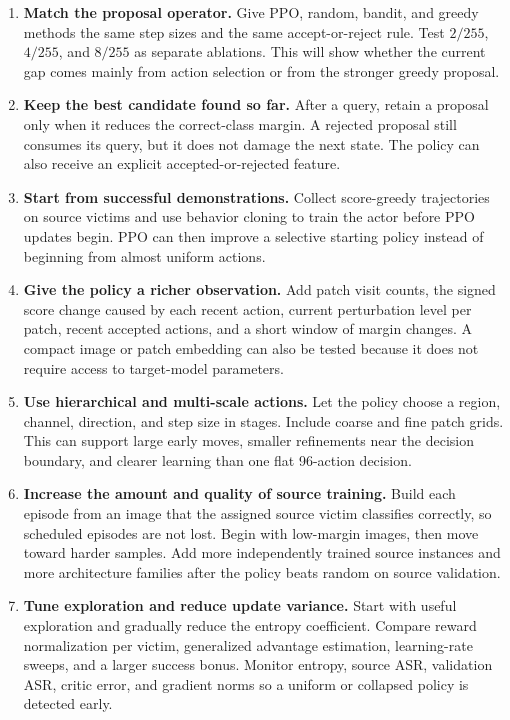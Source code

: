 \documentclass[11pt,a4paper]{report}
\begin{document}
\begin{enumerate}
  \item \textbf{Match the proposal operator.}
  Give PPO, random, bandit, and greedy methods the same step sizes and the same accept-or-reject rule. Test \(2/255\), \(4/255\), and \(8/255\) as separate ablations. This will show whether the current gap comes mainly from action selection or from the stronger greedy proposal.

  \item \textbf{Keep the best candidate found so far.}
  After a query, retain a proposal only when it reduces the correct-class margin. A rejected proposal still consumes its query, but it does not damage the next state. The policy can also receive an explicit accepted-or-rejected feature.

  \item \textbf{Start from successful demonstrations.}
  Collect score-greedy trajectories on source victims and use behavior cloning to train the actor before PPO updates begin. PPO can then improve a selective starting policy instead of beginning from almost uniform actions.

  \item \textbf{Give the policy a richer observation.}
  Add patch visit counts, the signed score change caused by each recent action, current perturbation level per patch, recent accepted actions, and a short window of margin changes. A compact image or patch embedding can also be tested because it does not require access to target-model parameters.

  \item \textbf{Use hierarchical and multi-scale actions.}
  Let the policy choose a region, channel, direction, and step size in stages. Include coarse and fine patch grids. This can support large early moves, smaller refinements near the decision boundary, and clearer learning than one flat 96-action decision.

  \item \textbf{Increase the amount and quality of source training.}
  Build each episode from an image that the assigned source victim classifies correctly, so scheduled episodes are not lost. Begin with low-margin images, then move toward harder samples. Add more independently trained source instances and more architecture families after the policy beats random on source validation.

  \item \textbf{Tune exploration and reduce update variance.}
  Start with useful exploration and gradually reduce the entropy coefficient. Compare reward normalization per victim, generalized advantage estimation, learning-rate sweeps, and a larger success bonus. Monitor entropy, source ASR, validation ASR, critic error, and gradient norms so a uniform or collapsed policy is detected early.


\end{enumerate}
\end{document}
